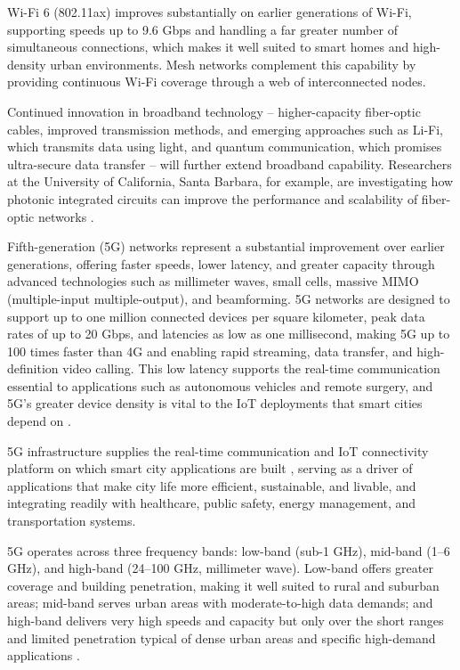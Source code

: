 \documentclass[journal]{IEEEtran}
\begin{document}
Wi-Fi 6 (802.11ax) improves substantially on earlier generations of Wi-Fi, supporting speeds up to 9.6 Gbps and handling a far greater number of simultaneous connections, which makes it well suited to smart homes and high-density urban environments. Mesh networks complement this capability by providing continuous Wi-Fi coverage through a web of interconnected nodes.

Continued innovation in broadband technology -- higher-capacity fiber-optic cables, improved transmission methods, and emerging approaches such as Li-Fi, which transmits data using light, and quantum communication, which promises ultra-secure data transfer -- will further extend broadband capability. Researchers at the University of California, Santa Barbara, for example, are investigating how photonic integrated circuits can improve the performance and scalability of fiber-optic networks \cite{r33}.

Fifth-generation (5G) networks represent a substantial improvement over earlier generations, offering faster speeds, lower latency, and greater capacity through advanced technologies such as millimeter waves, small cells, massive MIMO (multiple-input multiple-output), and beamforming. 5G networks are designed to support up to one million connected devices per square kilometer, peak data rates of up to 20 Gbps, and latencies as low as one millisecond, making 5G up to 100 times faster than 4G and enabling rapid streaming, data transfer, and high-definition video calling. This low latency supports the real-time communication essential to applications such as autonomous vehicles and remote surgery, and 5G's greater device density is vital to the IoT deployments that smart cities depend on \cite{r36}.

5G infrastructure supplies the real-time communication and IoT connectivity platform on which smart city applications are built \cite{r36}, serving as a driver of applications that make city life more efficient, sustainable, and livable, and integrating readily with healthcare, public safety, energy management, and transportation systems.

5G operates across three frequency bands: low-band (sub-1 GHz), mid-band (1--6 GHz), and high-band (24--100 GHz, millimeter wave). Low-band offers greater coverage and building penetration, making it well suited to rural and suburban areas; mid-band serves urban areas with moderate-to-high data demands; and high-band delivers very high speeds and capacity but only over the short ranges and limited penetration typical of dense urban areas and specific high-demand applications \cite{r37}.
\end{document}
